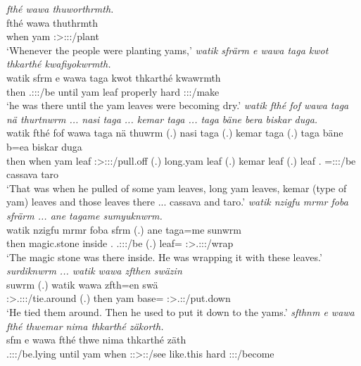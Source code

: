 \begin{exe}
	\emph{fthé wawa thuworthrmth.}\\
	\gll fthé wawa thuthrmth\\ 
	when yam \Stpl:\Sbj>\Stpl:\Obj:\Pst:\Dur/plant\\
	\trans `Whenever the people were planting yams,'
	\emph{watik sfrärm e wawa taga kwot thkarthé kwafiyokwrmth.}\\
	\gll watik sfrm e wawa taga kwot thkarthé kwawrmth\\ 
	then \Tsg.\Masc:\Sbj:\Pst:\Dur/be until yam leaf properly hard \Stpl:\Sbj:\Pst:\Dur/make\\
	\trans `he was there until the yam leaves were becoming dry.'
	\emph{watik fthé fof wawa taga nä thurtnwrm ... nasi taga ... kemar taga ... taga bäne bera biskar duga.}\\
	\gll watik fthé fof wawa taga nä thuwrm (.) nasi taga (.) kemar taga (.) taga bäne b=ea biskar duga\\ 
	then when {\Emph} yam leaf {\Indf} \Sg:\Sbj>\Stpl:\Obj:\Pst:\Dur/pull.off (.) long.yam leaf (.) kemar leaf (.) leaf \Recog.{\Abs} \Med=\Stpl:\Sbj:\Pst:\Ipfv/be cassava taro\\
	\trans `That was when he pulled of some yam leaves, long yam leaves, kemar (type of yam) leaves and those leaves there ... cassava and taro.'
	\emph{watik nzigfu mrmr foba sfrärm ... ane tagame sumyuknwrm.}\\
	\gll watik nzigfu mrmr foba sfrm (.) ane taga=me sunwrm\\ 
	then magic.stone inside \Dist.{\Abl} \Tsg.\Masc:\Sbj:\Pst:\Dur/be (.) {\Dem} leaf={\Ins} \Sg:\Sbj>\Tsg.\Masc:\Obj:\Pst:\Dur/wrap\\
	\trans `The magic stone was there inside. He was wrapping it with these leaves.'
	\emph{surdiknwrm ... watik wawa zfthen swäzin}\\
	\gll suwrm (.) watik wawa zfth=en swä\\ 
	\Sg:\Sbj>\Tsg.\Masc:\Obj:\Pst:\Dur/tie.around (.) then yam base={\Loc} \Stsg:\Sbj>\Tsg.\Masc:\Obj:\Iter/put.down\\
	\trans `He tied them around. Then he used to put it down to the yams.'
	\emph{sfthnm e wawa fthé thwemar nima thkarthé zäkorth.}\\
	\gll sfm e wawa fthé thwe nima thkarthé zäth\\ 
	\Tsg.\Masc:\Sbj:\Pst:\Dur/be.lying until yam when \Stsg:\Sbj:>\Stpl:\Obj:\Iter/see like.this hard \Stpl:\Sbj:\Pst:\Pfv/become\\

\end{exe}
